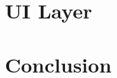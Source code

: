 \documentclass[onecolumn, draftclsnofoot,10pt, compsoc]{IEEEtran}
\begin{document}
\section{UI Layer}
  
\section{Conclusion}


\end{document}
